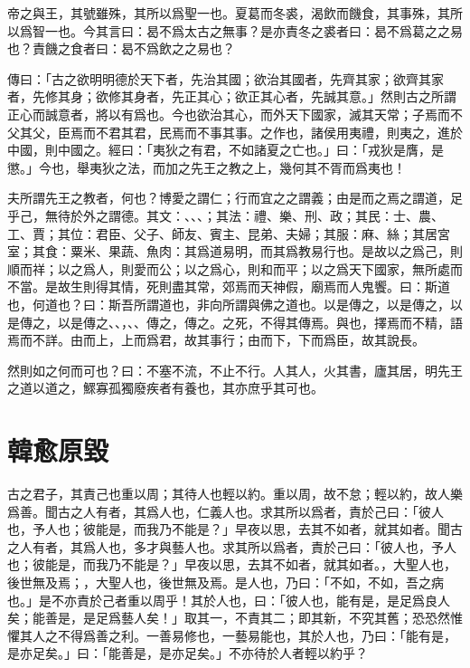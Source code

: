 帝之與王，其號雖殊，其所以爲聖一也。夏葛而冬裘，渴飲而饑食，其事殊，其所以爲智一也。今其言曰：曷不爲太古之無事？是亦責冬之裘者曰：曷不爲葛之之易也？責饑之食者曰：曷不爲飲之之易也？

傳曰：「古之欲明明德於天下者，先治其國；欲治其國者，先齊其家；欲齊其家者，先修其身；欲修其身者，先正其心；欲正其心者，先誠其意。」然則古之所謂正心而誠意者，將以有爲也。今也欲治其心，而外天下國家，滅其天常；子焉而不父其父，臣焉而不君其君，民焉而不事其事。之作也，諸侯用夷禮，則夷之，進於中國，則中國之。經曰：「夷狄之有君，不如諸夏之亡也。」曰：「戎狄是膺，是懲。」今也，舉夷狄之法，而加之先王之教之上，幾何其不胥而爲夷也！

夫所謂先王之教者，何也？博愛之謂仁；行而宜之之謂義；由是而之焉之謂道，足乎己，無待於外之謂德。其文：、、、；其法：禮、樂、刑、政；其民：士、農、工、賈；其位：君臣、父子、師友、賓主、昆弟、夫婦；其服：麻、絲；其居宮室；其食：粟米、果蔬、魚肉：其爲道易明，而其爲教易行也。是故以之爲己，則順而祥；以之爲人，則愛而公；以之爲心，則和而平；以之爲天下國家，無所處而不當。是故生則得其情，死則盡其常，郊焉而天神假，廟焉而人鬼饗。曰：斯道也，何道也？曰：斯吾所謂道也，非向所謂與佛之道也。以是傳之，以是傳之，以是傳之，以是傳之、、，、、傳之，傳之。之死，不得其傳焉。與也，擇焉而不精，語焉而不詳。由而上，上而爲君，故其事行；由而下，下而爲臣，故其說長。

然則如之何而可也？曰：不塞不流，不止不行。人其人，火其書，廬其居，明先王之道以道之，鰥寡孤獨廢疾者有養也，其亦庶乎其可也。

\section[原毀\quad{\small 韓愈}]{{\normalsize 韓愈}\quad 原毀}
古之君子，其責己也重以周；其待人也輕以約。重以周，故不怠；輕以約，故人樂爲善。聞古之人有者，其爲人也，仁義人也。求其所以爲者，責於己曰：「彼人也，予人也；彼能是，而我乃不能是？」早夜以思，去其不如者，就其如者。聞古之人有者，其爲人也，多才與藝人也。求其所以爲者，責於己曰：「彼人也，予人也；彼能是，而我乃不能是？」早夜以思，去其不如者，就其如者。，大聖人也，後世無及焉；，大聖人也，後世無及焉。是人也，乃曰：「不如，不如，吾之病也。」是不亦責於己者重以周乎！其於人也，曰：「彼人也，能有是，是足爲良人矣；能善是，是足爲藝人矣！」取其一，不責其二；即其新，不究其舊；恐恐然惟懼其人之不得爲善之利。一善易修也，一藝易能也，其於人也，乃曰：「能有是，是亦足矣。」曰：「能善是，是亦足矣。」不亦待於人者輕以約乎？

